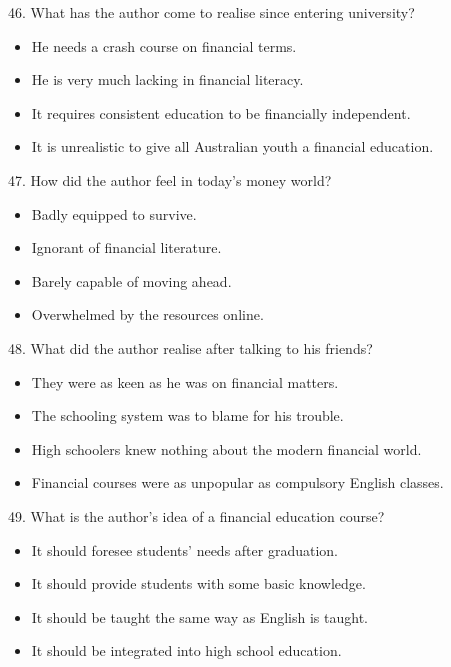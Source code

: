 \documentclass[UTF8,11pt]{ctexart}
\begin{document}
46. What has the author come to realise since entering university?


\begin{itemize}[leftmargin=2em,itemsep=.2em,topsep=.4em]\item[A.] He needs a crash course on financial terms.
\item[B.] He is very much lacking in financial literacy.
\item[C.] It requires consistent education to be financially independent.
\item[D.] It is unrealistic to give all Australian youth a financial education.
\end{itemize}

47. How did the author feel in today’s money world?


\begin{itemize}[leftmargin=2em,itemsep=.2em,topsep=.4em]\item[A.] Badly equipped to survive.
\item[B.] Ignorant of financial literature.
\item[C.] Barely capable of moving ahead.
\item[D.] Overwhelmed by the resources online.
\end{itemize}

48. What did the author realise after talking to his friends?


\begin{itemize}[leftmargin=2em,itemsep=.2em,topsep=.4em]\item[A.] They were as keen as he was on financial matters.
\item[B.] The schooling system was to blame for his trouble.
\item[C.] High schoolers knew nothing about the modern financial world.
\item[D.] Financial courses were as unpopular as compulsory English classes.
\end{itemize}

49. What is the author’s idea of a financial education course?


\begin{itemize}[leftmargin=2em,itemsep=.2em,topsep=.4em]\item[A.] It should foresee students’ needs after graduation.
\item[B.] It should provide students with some basic knowledge.
\item[C.] It should be taught the same way as English is taught.
\item[D.] It should be integrated into high school education.
\end{itemize}
\end{document}
